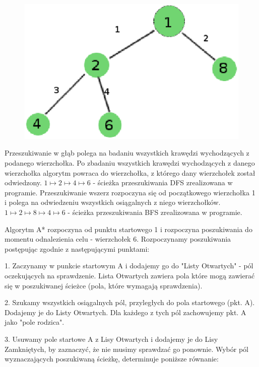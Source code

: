 \documentclass[12pt,a4paper]{article}
\begin{document}
\begin{figure}[h]
\centering
\caption[Graf]{}
\label{fig:graf}
\includegraphics[width=0.7\linewidth]{./graf}
\end{figure}


Przeszukiwanie w głąb polega na badaniu wszystkich krawędzi wychodzących z podanego wierzchołka. Po zbadaniu wszystkich krawędzi wychodzących z danego wierzchołka algorytm powraca do wierzchołka, z którego dany wierzchołek został odwiedzony.\newline
$ 1 \mapsto 2 \mapsto 4 \mapsto 6 $  - ścieżka przeszukiwania DFS zrealizowana w programie.\newline
\newline
Przeszukiwanie wszerz rozpoczyna się od początkowego wierzchołka 1 i polega na odwiedzeniu wszystkich osiągalnych z niego wierzchołków.\newline
$ 1 \mapsto 2 \mapsto 8 \mapsto 4 \mapsto 6 $ - ścieżka przeszukiwania BFS zrealizowana w programie. \newline


Algorytm A* rozpoczyna od punktu startowego 1 i rozpoczyna poszukiwania do momentu odnalezienia celu - wierzchołek 6.
Rozpoczynamy poszukiwania postępując zgodnie z następującymi punktami:\newline

1. Zaczynamy w punkcie startowym A i dodajemy go do "Listy Otwartych" - pól oczekujących na sprawdzenie. Lista Otwartych zawiera pola które mogą zawierać się w poszukiwanej ścieżce (pola, które wymagają sprawdzenia).\newline

2. Szukamy wszystkich osiągalnych pól, przyległych do pola startowego (pkt. A). Dodajemy je do Listy Otwartych. Dla każdego z tych pól zachowujemy pkt. A jako "pole rodzica".\newline

3. Usuwamy pole startowe A z Lisy Otwartych i dodajemy je do Lisy Zamkniętych, by zaznaczyć, że nie musimy sprawdzać go ponownie.\newline
\newline
Wybór pól wyznaczających poszukiwaną ścieżkę, determinuje poniższe równanie:\newline
\end{document}
